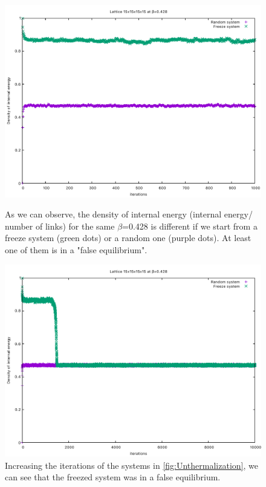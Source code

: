         \noindent
        \begin{figure}[H]
            \centering
            \includegraphics[scale=0.3]{Unthermalization.pdf}
            \caption{As we can observe, the density of internal energy (internal energy/ number of links) for the same ${\beta}$=0.428 is different if we start from 
            a freeze system (green dots) or a random one (purple dots). At least one of them is in a "false equilibrium". }
            \label{fig:Unthermalization} 
            \includegraphics[scale=0.3]{MatchingThermalization.pdf}
            \caption{Increasing the iterations of the systems in \cref{fig:Unthermalization}, we can see that the freezed system was in a false equilibrium.}
            \label{fig:MatchingThermalization}
        \end{figure}


